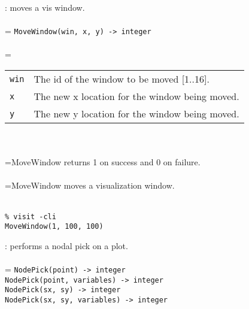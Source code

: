 \documentclass[10pt,a4paper]{report}
\begin{document}
{}
: moves a vis window.\\[-3mm]

 \\ 
\hangindent=\parindent 
\verb!MoveWindow(win, x, y) -> integer!\\ [-3mm]

 \\ 
\hangindent=\parindent 
\begin{tabular}{lp{9cm}}
\verb!win! & The id of the window to be moved [1..16]. \\
\verb!x! & The new x location for the window being moved. \\
\verb!y! & The new y location for the window being moved. \\
\end{tabular} \\[-2mm]


 \\ 
\hangindent=\parindent MoveWindow returns 1 on success and 0 on failure. \\[-3mm] 

 \\ 
\hangindent=\parindent MoveWindow moves a visualization window. \\[-3mm] 

\\[-6mm]
\begin{verbatim}% visit -cli
MoveWindow(1, 100, 100)
\end{verbatim}
\newpage


{}
: performs a nodal pick on a plot.\\[-3mm]

 \\ 
\hangindent=\parindent 
\verb!NodePick(point) -> integer!\\ 
\verb!NodePick(point, variables) -> integer!\\ 
\verb!NodePick(sx, sy) -> integer!\\ 
\verb!NodePick(sx, sy, variables) -> integer!\\ [-3mm]
\end{document}
